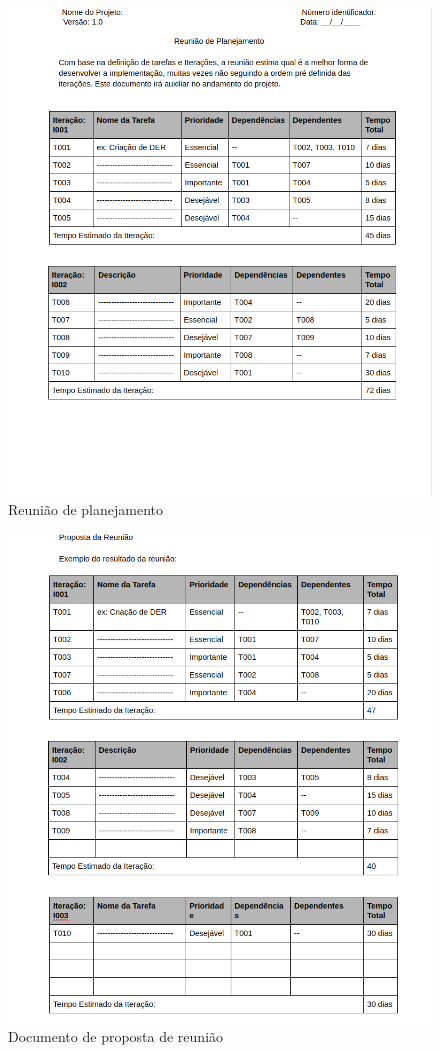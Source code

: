 \documentclass[	DIV=calc,%
							paper=a4,%
							fontsize=12pt,%
							onecolumn]{scrartcl}	 					%
\begin{document}
\begin{figure}
	\centering
	\includegraphics[width=\textwidth]{planejamento1}
	\caption{Reunião de planejamento}
	\label{Figura 5}
\end{figure}


\begin{figure}
	\centering
	\includegraphics[width=\textwidth]{planejamento2}
	\caption{Documento de proposta de reunião}
	\label{Figura 6}
\end{figure}
\end{document}
